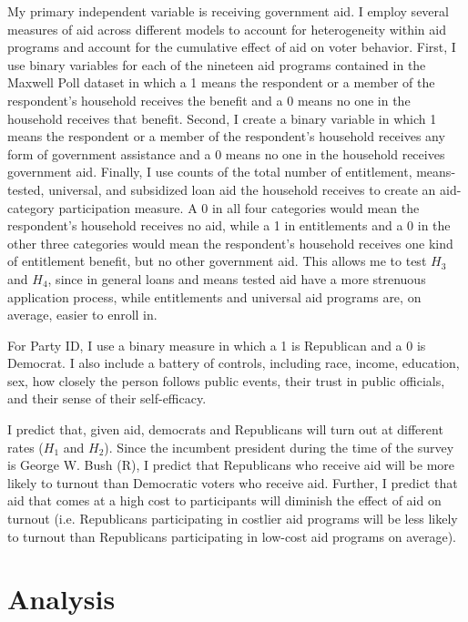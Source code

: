 \documentclass[12pt]{paper}
\begin{document}
My primary independent variable is receiving government aid. I employ several measures of aid across different models to account for heterogeneity within aid programs and account for the cumulative effect of aid on voter behavior. First, I use binary variables for each of the nineteen aid programs contained in the Maxwell Poll dataset in which a 1 means the respondent or a member of the respondent’s household receives the benefit and a 0 means no one in the household receives that benefit. Second, I create a binary variable in which 1 means the respondent or a member of the respondent’s household receives any form of government assistance and a 0 means no one in the household receives government aid. Finally, I use counts of the total number of entitlement, means-tested, universal, and subsidized loan aid the household receives to create an aid-category participation measure. A 0 in all four categories would mean the respondent’s household receives no aid, while a 1 in entitlements and a 0 in the other three categories would mean the respondent’s household receives one kind of entitlement benefit, but no other government aid. This allows me to test $H_3$ and $H_4$, since in general loans and means tested aid have a more strenuous application process, while entitlements and universal aid programs are, on average, easier to enroll in.

For Party ID, I use a binary measure in which a 1 is Republican and a 0 is Democrat. I also include a battery of controls, including race, income, education, sex, how closely the person follows public events, their trust in public officials, and their sense of their self-efficacy.

I predict that, given aid, democrats and Republicans will turn out at different rates ($H_1$ and $H_2$). Since the incumbent president during the time of the survey is George W. Bush (R), I predict that Republicans who receive aid will be more likely to turnout than Democratic voters who receive aid. Further, I predict that aid that comes at a high cost to participants will diminish the effect of aid on turnout (i.e. Republicans participating in costlier aid programs will be less likely to turnout than Republicans participating in low-cost aid programs on average).

\section{Analysis}
\end{document}
